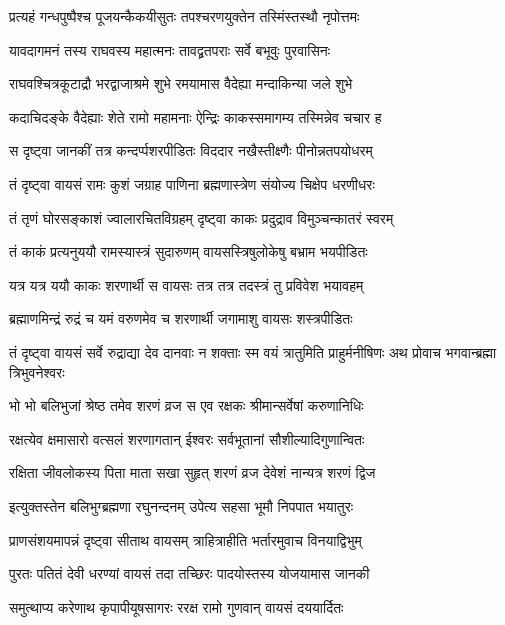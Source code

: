 \twolineshloka
{प्रत्यहं गन्धपुष्पैश्च पूजयन्कैकयीसुतः}
{तपश्चरणयुक्तेन तस्मिंस्तस्थौ नृपोत्तमः}%

\twolineshloka
{यावदागमनं तस्य राघवस्य महात्मनः}
{तावद्व्रतपराः सर्वे बभूवुः पुरवासिनः}%

\twolineshloka
{राघवश्चित्रकूटाद्रौ भरद्वाजाश्रमे शुभे}
{रमयामास वैदेह्या मन्दाकिन्या जले शुभे}%

\twolineshloka
{कदाचिदङ्के वैदेह्याः शेते रामो महामनाः}
{ऐन्द्रिः काकस्समागम्य तस्मिन्नेव चचार ह}%

\twolineshloka
{स दृष्ट्वा जानकीं तत्र कन्दर्प्पशरपीडितः}
{विददार नखैस्तीक्ष्णैः पीनोन्नतपयोधरम्}%

\twolineshloka
{तं दृष्ट्वा वायसं रामः कुशं जग्राह पाणिना}
{ब्रह्मणास्त्रेण संयोज्य चिक्षेप धरणीधरः}%

\twolineshloka
{तं तृणं घोरसङ्काशं ज्वालारचितविग्रहम्}
{दृष्ट्वा काकः प्रदुद्राव विमुञ्चन्कातरं स्वरम्}%

\twolineshloka
{तं काकं प्रत्यनुययौ रामस्यास्त्रं सुदारुणम्}
{वायसस्त्रिषुलोकेषु बभ्राम भयपीडितः}%

\twolineshloka
{यत्र यत्र ययौ काकः शरणार्थी स वायसः}
{तत्र तत्र तदस्त्रं तु प्रविवेश भयावहम्}%

\twolineshloka
{ब्रह्माणमिन्द्रं रुद्रं च यमं वरुणमेव च}
{शरणार्थी जगामाशु वायसः शस्त्रपीडितः}%


\threelineshloka
{तं दृष्ट्वा वायसं सर्वे रुद्राद्या देव दानवाः}
{न शक्ताः स्म वयं त्रातुमिति प्राहुर्मनीषिणः}
{अथ प्रोवाच भगवान्ब्रह्मा त्रिभुवनेश्वरः}%


\twolineshloka
{भो भो बलिभुजां श्रेष्ठ तमेव शरणं व्रज}
{स एव रक्षकः श्रीमान्सर्वेषां करुणानिधिः}%

\twolineshloka
{रक्षत्येव क्षमासारो वत्सलं शरणागतान्}
{ईश्वरः सर्वभूतानां सौशील्यादिगुणान्वितः}%

\twolineshloka
{रक्षिता जीवलोकस्य पिता माता सखा सुहृत्}
{शरणं व्रज देवेशं नान्यत्र शरणं द्विज}%


\twolineshloka
{इत्युक्तस्तेन बलिभुग्ब्रह्मणा रघुनन्दनम्}
{उपेत्य सहसा भूमौ निपपात भयातुरः}%

\twolineshloka
{प्राणसंशयमापन्नं दृष्ट्वा सीताथ वायसम्}
{त्राहित्राहीति भर्तारमुवाच विनयाद्विभुम्}%

\twolineshloka
{पुरतः पतितं देवी धरण्यां वायसं तदा}
{तच्छिरः पादयोस्तस्य योजयामास जानकी}%

\twolineshloka
{समुत्थाप्य करेणाथ कृपापीयूषसागरः}
{ररक्ष रामो गुणवान् वायसं दययार्दितः}%

